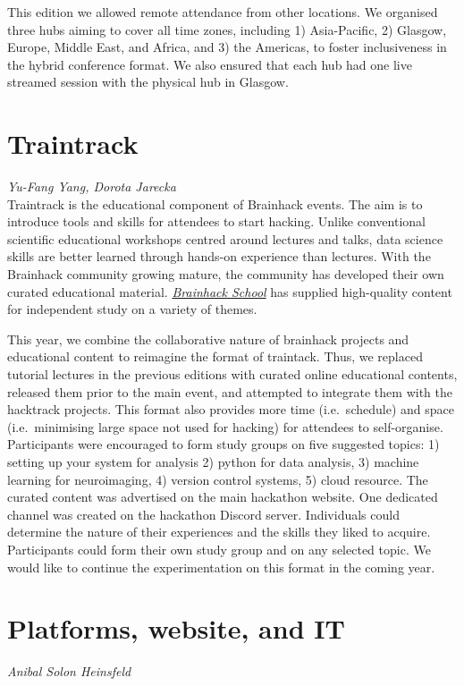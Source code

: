 \documentclass[12pt,a4paper]{proc}
\let\Oldsection\section
\renewcommand{\section}{\FloatBarrier\Oldsection}
\newcommand{\authors}[1]{\emph{\footnotesize #1} \\}
\begin{document}
This edition we allowed remote attendance from other locations. We
organised three hubs aiming to cover all time zones, including 1)
Asia-Pacific, 2) Glasgow, Europe, Middle East, and Africa, and 3) the
Americas, to foster inclusiveness in the hybrid conference format. We also
ensured that each hub had one live streamed session with the physical
hub in Glasgow.

\section{Traintrack}
\authors{Yu-Fang Yang, %
Dorota Jarecka}
%

Traintrack is the educational component of Brainhack events. The aim is
to introduce tools and skills for attendees to start hacking. Unlike
conventional scientific educational workshops centred around lectures
and talks, data science skills are better learned through hands-on
experience than lectures. With the Brainhack community growing mature,
the community has developed their own curated educational material.
\href{https://school.brainhackmtl.org/}{\emph{Brainhack School}} has
supplied high-quality content for independent study on a variety of
themes.

This year, we combine the collaborative nature of brainhack projects and
educational content to reimagine the format of traintack. Thus, we
replaced tutorial lectures in the previous editions with curated online
educational contents, released them prior to the main event, and
attempted to integrate them with the hacktrack projects. This format
also provides more time (i.e.\ schedule) and space (i.e.\ minimising large
space not used for hacking) for attendees to self-organise. Participants
were encouraged to form study groups on five suggested topics: 1)
setting up your system for analysis 2) python for data analysis, 3)
machine learning for neuroimaging, 4) version control systems, 5) cloud
resource. The curated content was advertised on the main hackathon
website. One dedicated channel was created on the hackathon Discord
server. Individuals could determine the nature of their experiences and
the skills they liked to acquire. Participants could form their own
study group and on any selected topic. We would like to continue the
experimentation on this format in the coming year.

\section{Platforms, website, and IT}
\authors{Anibal Solon Heinsfeld}
%
\end{document}

